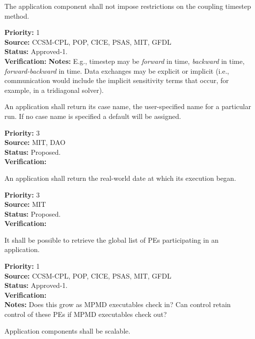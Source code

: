 The application component shall not impose restrictions on the
coupling timestep method.  
\begin{reqlist}
{\bf Priority:}  1 \\ 
{\bf Source:}  CCSM-CPL, POP, CICE, PSAS, MIT, GFDL \\
{\bf Status:} Approved-1. \\
{\bf Verification:} 
{\bf Notes:} E.g., timestep may be \emph{forward} in time,
\emph{backward} in time, \emph{forward-backward} in time.  Data exchanges may be
explicit or implicit (i.e., communication would include the implicit sensitivity 
terms that occur, for example, in a tridiagonal solver).
\end{reqlist}


An application shall return its case name, the user-specified name for 
a particular run.  If no case name is specified a default will 
be assigned.
\begin{reqlist}
{\bf Priority:} 3 \\
{\bf Source:} MIT, DAO \\
{\bf Status:} Proposed.\\
{\bf Verification:}  
\end{reqlist}

An application shall return the real-world date at which its execution
began.
\begin{reqlist}
{\bf Priority:} 3\\
{\bf Source:} MIT \\
{\bf Status:} Proposed.\\
{\bf Verification:} 
\end{reqlist}

It shall be possible to retrieve the global list of PEs participating 
in an application.
\begin{reqlist}
{\bf Priority:} 1 \\
{\bf Source:}  CCSM-CPL, POP, CICE, PSAS, MIT, GFDL \\
{\bf Status:} Approved-1. \\
{\bf Verification:} \\ 
{\bf Notes:}  Does this grow as MPMD executables check in? Can control
  retain control of these PEs if MPMD executables check out?
\end{reqlist}

Application components shall be scalable.

